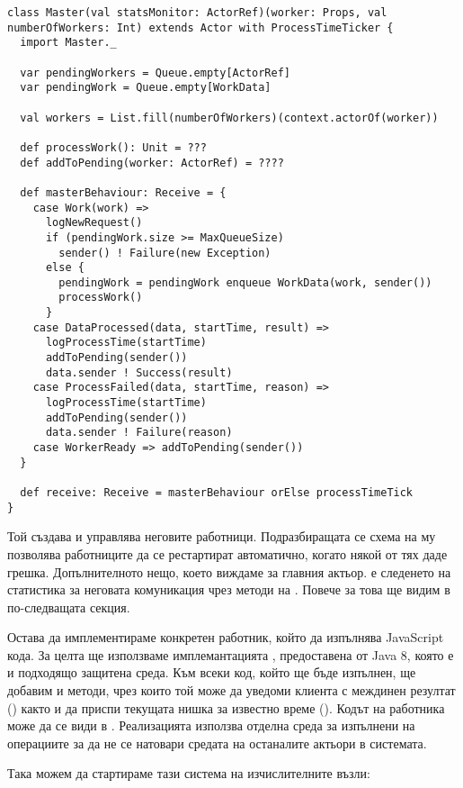 \begin{lstlisting}
class Master(val statsMonitor: ActorRef)(worker: Props, val numberOfWorkers: Int) extends Actor with ProcessTimeTicker {
  import Master._
  
  var pendingWorkers = Queue.empty[ActorRef]
  var pendingWork = Queue.empty[WorkData]
  
  val workers = List.fill(numberOfWorkers)(context.actorOf(worker))
  
  def processWork(): Unit = ???
  def addToPending(worker: ActorRef) = ????
  
  def masterBehaviour: Receive = {
    case Work(work) =>
      logNewRequest()
      if (pendingWork.size >= MaxQueueSize)
        sender() ! Failure(new Exception)
      else {
        pendingWork = pendingWork enqueue WorkData(work, sender())
        processWork()
      }
    case DataProcessed(data, startTime, result) =>
      logProcessTime(startTime)
      addToPending(sender())
      data.sender ! Success(result)
    case ProcessFailed(data, startTime, reason) =>
      logProcessTime(startTime)
      addToPending(sender())
      data.sender ! Failure(reason)
    case WorkerReady => addToPending(sender())
  }
  
  def receive: Receive = masterBehaviour orElse processTimeTick
}
\end{lstlisting}

Той създава и управлява неговите работници. Подразбиращата се схема на  му позволява работниците да се рестартират автоматично, когато някой от тях даде грешка. Допълнителното нещо, което виждаме за главния актьор. е следенето на статистика за неговата комуникация чрез методи на . Повече за това ще видим в по-следващата секция.

Остава да имплементираме конкретен работник, който да изпълнява JavaScript кода. За целта ще използваме имплемантацията , предоставена от Java 8, която е и подходящо защитена среда. Към всеки код, който ще бъде изпълнен, ще добавим и методи, чрез които той може да уведоми клиента с междинен резултат () както и да приспи текущата нишка за известно време (). Кодът на работника може да се види в . Реализацията използва отделна среда за изпълнени на операциите за да не се натовари средата на останалите актьори в системата.

Така можем да стартираме тази система на изчислителните възли:

